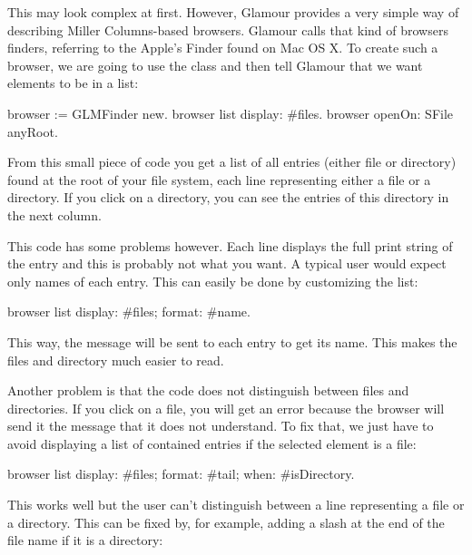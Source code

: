 \documentclass[a4paper,10pt,twoside]{book}
\begin{document}
This may look complex at first. However, Glamour provides a very
simple way of describing Miller Columns-based browsers. Glamour calls
that kind of browsers finders, referring to the Apple's Finder found
on Mac OS X. To create such a browser, we are going to use the
 class and then tell Glamour that we want elements
to be in a list:


\begin{code}{}
browser := GLMFinder new.
browser list
	display: #files.
browser openOn: SFile anyRoot.
\end{code}

From this small piece of code you get a list of all entries (either
file or directory) found at the root of your file system, each line
representing either a file or a directory. If you click on a
directory, you can see the entries of this directory in the next
column.


This code has some problems however. Each line displays the full print
string of the entry and this is probably not what you want. A typical
user would expect only names of each entry. This can easily be done by
customizing the list:

\begin{code}{}
browser list
  display: #files;
  format: #name.
\end{code}

This way, the message  will be sent to each entry to get its
name. This makes the files and directory much easier to read.


Another problem is that the code does not distinguish between files
and directories. If you click on a file, you will get an error because
the browser will send it the message  that it does not
understand. To fix that, we just have to avoid displaying a list of
contained entries if the selected element is a file:

\begin{code}{}
browser list
  display: #files;
  format: #tail;
  when: #isDirectory.
\end{code}

This works well but the user can't distinguish between a line
representing a file or a directory. This can be fixed by, for example,
adding a slash at the end of the file name if it is a directory:
\end{document}
